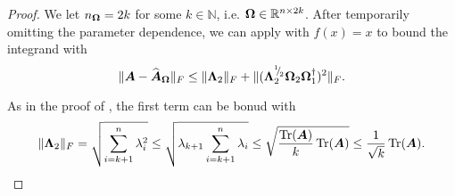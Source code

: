 \documentclass[12pt]{article}
\begin{document}
\begin{proof}
    We let $n_{\boldsymbol{\Omega}} = 2k$ for some $k \in \mathbb{N}$, i.e. $\boldsymbol{\Omega} \in \mathbb{R}^{n \times 2k}$. After temporarily omitting the parameter dependence, we can apply \cite[Theorem B.1]{persson-2023-randomized-lowrank} with $f(x) = x$ to bound the integrand with 
    \begin{equation}
        \lVert \boldsymbol{A} - \widehat{\boldsymbol{A}}_{\boldsymbol{\Omega}} \rVert _F 
        \leq  \lVert \boldsymbol{\Lambda}_2 \rVert _F + \lVert (\boldsymbol{\Lambda}_2^{{}^{1}{\mskip -5mu/\mskip -3mu}_{2}} \boldsymbol{\Omega}_2 \boldsymbol{\Omega}_1^{\dagger} )^2 \rVert _F.
        \label{equ:nystrom-proof-persson-bonud}
    \end{equation}
    
    As in the proof of \cite[Lemma 3]{meyer-2021-hutch-optimal}, the first term can be bonud with
    \begin{equation}
        \lVert \boldsymbol{\Lambda}_2 \rVert _F
        = \sqrt{\sum_{i=k+1}^{n} \lambda_i^2}
        \leq \sqrt{ \lambda_{k+1} \sum_{i=k+1}^{n} \lambda_i}
        \leq \sqrt{ \frac{\operatorname{Tr}(\boldsymbol{A})}{k} \operatorname{Tr}(\boldsymbol{A})}
        \leq \frac{1}{\sqrt{k}} \operatorname{Tr}(\boldsymbol{A}).
        \label{equ:nystrom-proof-frobenius-trace}
    \end{equation}


\end{proof}
\end{document}
